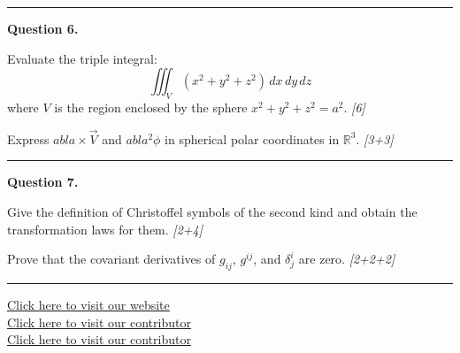 \documentclass[11pt,a4paper]{article}
\newcommand{\pts}[1]{\hfill   \textit{[#1]}}
\begin{document}
\medskip\rule{\linewidth}{0.2pt}

\medskip


\noindent   \textbf{Question 6.}

\begin{parts}
  \item Evaluate the triple integral:
  \[
  \iiint_V (x^2 + y^2 + z^2) \, dx\,dy\,dz
  \]
  where $V$ is the region enclosed by the sphere $x^2 + y^2 + z^2 = a^2$. \pts{6}
  \item Express $
abla  \times \vec{V}$ and $
abla^2\phi$ in spherical polar coordinates in $\mathbb{R}^3$. \pts{3+3}
\end{parts}

\medskip\rule{\linewidth}{0.2pt}

\medskip


\noindent   \textbf{Question 7.}

\begin{parts}
  \item Give the definition of Christoffel symbols of the second kind and obtain the transformation laws for them. \pts{2+4}
  \item Prove that the covariant derivatives of $g_{ij}$, $g^{ij}$, and $\delta^i_j$ are zero. \pts{2+2+2}
\end{parts}

\vfill
\rule{\linewidth}{0.4pt}

\begin{center}\small
  \href{https://bhu-exam.vercel.app/}{Click here to visit our website}\\[4pt]
  \href{https://me-aryan.vercel.app/}{Click here to visit our contributor}\\[4pt]
  \href{https://quashan-me.vercel.app/}{Click here to visit our contributor}
\end{center}
\end{document}
